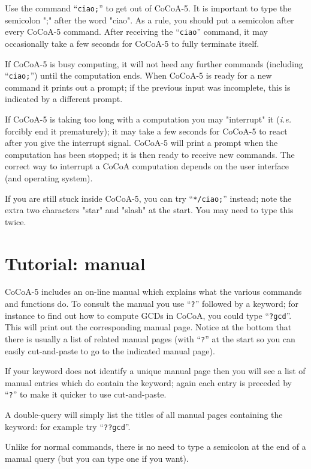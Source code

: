 \documentclass[a4paper]{mybook}
\begin{document}
        
Use the command ``\verb&ciao;&'' to get out of CoCoA-5.  It is important to type
the semicolon ";" after the word "ciao".  As a rule, you should put a
semicolon after every CoCoA-5 command.  After receiving the ``\verb&ciao&''
command, it may occasionally take a few seconds for CoCoA-5 to fully
terminate itself.
\par 
If CoCoA-5 is busy computing, it will not heed any further commands
(including ``\verb&ciao;&'') until the computation ends.  When CoCoA-5 is
ready for a new command it prints out a prompt; if the previous input
was incomplete, this is indicated by a different prompt.
\par 
If CoCoA-5 is taking too long with a computation you may "interrupt" it
(\textit{i.e.} forcibly end it prematurely); it may take a few seconds for
CoCoA-5 to react after you give the interrupt signal.  CoCoA-5 will print
a prompt when the computation has been stopped; it is then ready to
receive new commands.  The correct way to interrupt a CoCoA computation
depends on the user interface (and operating system).
\par 
If you are still stuck inside CoCoA-5, you can try ``\verb&*/ciao;&'' instead;
note the extra two characters "star" and "slash" at the start.  You may
need to type this twice.


\section{Tutorial: manual}
\label{Tutorial: manual}

        
CoCoA-5 includes an on-line manual which explains what the various
commands and functions do.  To consult the manual you use ``\verb&?&''
followed by a keyword; for instance to find out how to compute
GCDs in CoCoA, you could type ``\verb&?gcd&''.  This will print out the
corresponding manual page.  Notice at the bottom that there is usually
a list of related manual pages (with ``\verb&?&'' at the start so you can
easily cut-and-paste to go to the indicated manual page).
\par 
If your keyword does not identify a unique manual page then you will see
a list of manual entries which do contain the keyword; again each entry
is preceded by ``\verb&?&'' to make it quicker to use cut-and-paste.
\par 
A double-query will simply list the titles of all manual pages containing
the keyword: for example try ``\verb&??gcd&''.
\par 
Unlike for normal commands, there is no need to type a semicolon at
the end of a manual query (but you can type one if you want).
\end{document}
